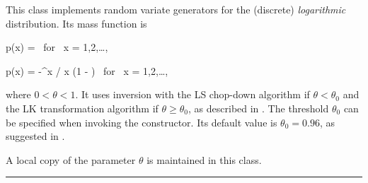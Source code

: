 
This class implements random variate generators for the (discrete)
{\em logarithmic\/} distribution. Its  mass function is
\eq
\begin{latexonly}
  p(x) =  \qquad\mbox{ for } x = 1,2,\ldots,
\end{latexonly}
\begin{htmlonly}
  p(x) = {-\theta^x} / {x \log(1 - \theta)} \qquad\mbox{ for } x = 1,2,\ldots,
\end{htmlonly}
\endeq
where $0 < \theta <1$.
It uses inversion with the LS chop-down algorithm if $\theta < \theta_0$
and the LK transformation algorithm if $\theta \ge \theta_0$,
as described in \cite{rKEM81a}.
The threshold $\theta_0$ can be specified when invoking the constructor.
Its default value is $\theta_0 = 0.96$, as suggested in \cite{rKEM81a}.
%


A local copy of the parameter $\theta$ is maintained in this class.

\bigskip\hrule

